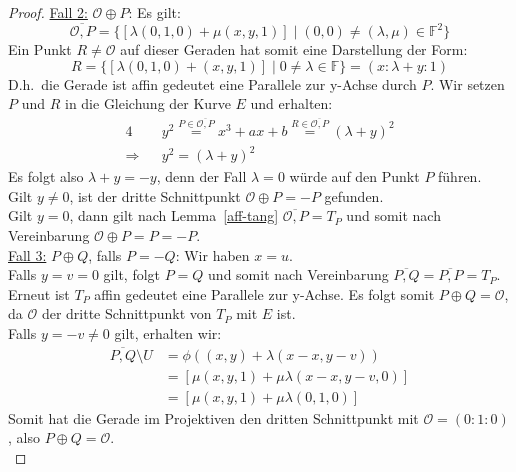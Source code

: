 \documentclass[hidelinks]{article}
\theoremstyle{plain}
\theoremstyle{definition}
\theoremstyle{rem}
\newcommand{\patinf}{\mathcal{O}}
\begin{document}
\begin{sloppypar}
\begin{proof}
    \underline{Fall 2:} $\patinf\oplus P$: Es gilt:
    \begin{equation*}
        \overline{\patinf,P}=\bigl\{[\lambda(0,1,0)+\mu(x,y,1)]\mid (0,0)\ne(\lambda,\mu)\in\mathbb{F}^2\bigr \}
    \end{equation*}
    Ein Punkt $R\ne\patinf$ auf dieser Geraden hat somit eine Darstellung der Form:
    \begin{equation*}
        R=\bigl\{[\lambda(0,1,0)+(x,y,1)]\mid 0\ne\lambda\in\mathbb{F}\bigr \}=(x:\lambda+y:1)
    \end{equation*}
    D.h.\ die Gerade ist affin gedeutet eine Parallele zur y-Achse durch $P$. Wir setzen $P$ und $R$ in die Gleichung der Kurve $E$ und erhalten:
    \begin{alignat*}{4}
        &&y^2\stackrel{P\in\overline{\patinf,P}}{=}x^3+ax+b\stackrel{R\in\overline{\patinf,P}}{=}(\lambda+y)^2\\
        \Rightarrow&&y^2=(\lambda+y)^2
    \end{alignat*}
    Es folgt also $\lambda+y=-y$, denn der Fall $\lambda=0$ würde auf den Punkt $P$ führen.\\
    Gilt $y\ne 0$, ist der dritte Schnittpunkt $\patinf\oplus P=-P$ gefunden.\\
    Gilt $y=0$, dann gilt nach Lemma~\ref{aff-tang} $\overline{\patinf,P}=T_P$ und somit nach Vereinbarung $\patinf\oplus P=P=-P$.\\

    \underline{Fall 3:} $P\oplus Q$, falls $P=-Q$: Wir haben $x=u$.\\
    Falls $y=v=0$ gilt, folgt $P=Q$ und somit nach Vereinbarung $\overline{P,Q}=\overline{P,P}=T_P$. Erneut ist $T_P$ affin gedeutet eine Parallele zur y-Achse.
    Es folgt somit $P\oplus Q=\patinf$, da $\patinf$ der dritte Schnittpunkt von $T_P$ mit $E$ ist.\\
    Falls $y=-v\ne 0$ gilt, erhalten wir:
    \begin{align*}
        \overline{P,Q}\setminus U&=\phi((x,y)+\lambda(x-x,y-v))\\
        &=[\mu(x,y,1)+\mu\lambda(x-x,y-v,0)]\\
        &=[\mu(x,y,1)+\mu\lambda(0,1,0)]
    \end{align*}
    Somit hat die Gerade im Projektiven den dritten Schnittpunkt mit $\patinf=(0:1:0)$, also $P\oplus Q=\patinf$.\\


\end{proof}
\end{sloppypar}
\end{document}
